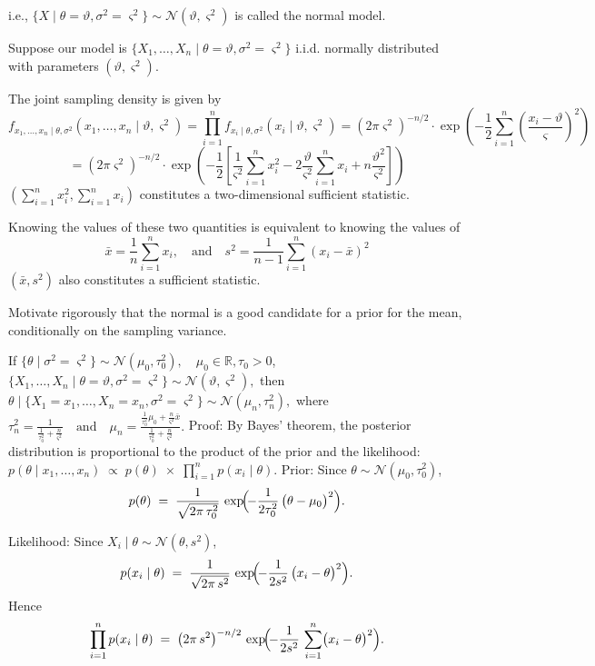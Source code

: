i.e., \(\{ X \mid \theta = \vartheta, \sigma^2 = \varsigma^2 \} \sim \mathcal{N}(\vartheta, \varsigma^2)\) is called the normal model.

Suppose our model is 
\( \{X_1, \ldots, X_n \mid \theta = \vartheta, \sigma^2 = \varsigma^2 \} \) 
i.i.d. normally distributed with parameters \((\vartheta, \varsigma^2)\).

The joint sampling density is given by
\[
f_{x_1, \ldots, x_n \mid \theta, \sigma^2}(x_1, \ldots, x_n \mid \vartheta, \varsigma^2) = \prod_{i=1}^n f_{x_i \mid \theta, \sigma^2}(x_i \mid \vartheta, \varsigma^2) = (2\pi \varsigma^2)^{-n/2} \cdot \exp \left( -\frac{1}{2} \sum_{i=1}^n \left( \frac{x_i - \vartheta}{\varsigma} \right)^2 \right)
\]
\[
= (2 \pi \varsigma^2)^{-n/2} \cdot \exp \left( -\frac{1}{2} \left[ \frac{1}{\varsigma^2} \sum_{i=1}^n x_i^2 - 2 \frac{\vartheta}{\varsigma^2} \sum_{i=1}^n x_i + n \frac{\vartheta^2}{\varsigma^2} \right] \right)
\]
\((\sum_{i=1}^n x_i^2, \sum_{i=1}^n x_i)\) constitutes a two-dimensional sufficient statistic.

Knowing the values of these two quantities is equivalent to knowing the values of
\[
\bar{x} = \frac{1}{n} \sum_{i=1}^n x_i, \quad \text{and} \quad s^2 = \frac{1}{n-1} \sum_{i=1}^n (x_i - \bar{x})^2
\]
\((\bar{x}, s^2)\) also constitutes a sufficient statistic.


Motivate rigorously that the normal is a good candidate for a prior for the mean,
conditionally on the sampling variance.

If 
\(
\{ \theta \mid \sigma^2 = \varsigma^2 \} \sim \mathcal{N}(\mu_0, \tau_0^2), \quad \mu_0 \in \mathbb{R}, \tau_0 > 0
\),
\(
\{ X_1, \ldots, X_n \mid \theta = \vartheta, \sigma^2 = \varsigma^2 \} \sim \mathcal{N}(\vartheta, \varsigma^2),
\)
then
\(
\theta \mid \{X_1 = x_1, \ldots, X_n = x_n, \sigma^2 = \varsigma^2\} \sim \mathcal{N}(\mu_n, \tau_n^2),
\)
where
\(
\tau_n^2 = \frac{1}{\frac{1}{\tau_0^2} + \frac{n}{\varsigma^2}} \quad \text{and} \quad \mu_n = \frac{\frac{1}{\tau_0^2} \mu_0 + \frac{n}{\varsigma^2} \bar{x}}{\frac{1}{\tau_0^2} + \frac{n}{\varsigma^2}}.
\)
Proof:
By Bayes’ theorem, the posterior distribution is proportional to the product of the prior and the likelihood:
\(
p(\theta \mid x_1,\dots,x_n)
\;\propto\;
p(\theta)
\;\times\;
\prod_{i=1}^n p(x_i \mid \theta).
\)
Prior: Since \(\theta \sim \mathcal{N}(\mu_0, \tau_0^2)\),
  \[
  p(\theta)
  \;=\;
  \frac{1}{\sqrt{2\pi\,\tau_0^2}}
  \,\exp\!\Bigl(\!-\frac{1}{2\tau_0^2}\,\bigl(\theta - \mu_0\bigr)^2\Bigr).
  \]

Likelihood: Since \(X_i \mid \theta \sim \mathcal{N}(\theta, s^2)\),
\[
p(x_i \mid \theta)
\;=\;
\frac{1}{\sqrt{2\pi\,s^2}}
\,\exp\!\Bigl(\!-\frac{1}{2s^2}\,\bigl(x_i - \theta\bigr)^2\Bigr).
\]
Hence
\[
\prod_{i=1}^n p(x_i \mid \theta)
\;=\;
\bigl(2\pi\,s^2\bigr)^{-n/2}
\,\exp\!\Bigl(\!-\frac{1}{2s^2}\,\sum_{i=1}^n\bigl(x_i - \theta\bigr)^2\Bigr).
\]

